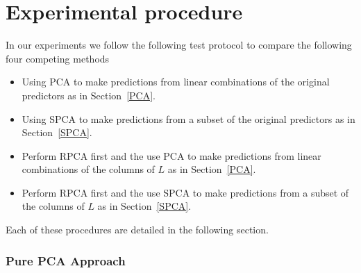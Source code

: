\documentclass[conference]{IEEEtran}
\begin{document}



\section{Experimental procedure}
In our experiments we follow the following test protocol to compare the following four competing methods
\begin{itemize}
    \item Using PCA to make predictions from linear combinations of the original predictors as in Section~\ref{PCA}.
    \item Using SPCA to make predictions from a subset of the original predictors as in Section~\ref{SPCA}.
    \item Perform RPCA first and the use PCA to make predictions from linear combinations of the columns of $L$ as in Section~\ref{PCA}.
    \item Perform RPCA first and the use SPCA to make predictions from a subset of the columns of $L$ as in Section~\ref{SPCA}.
\end{itemize}

Each of these procedures are detailed in the following section.


\subsubsection{Pure PCA Approach}

\end{document}
